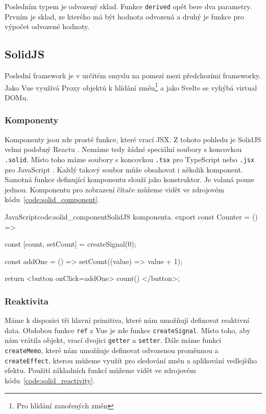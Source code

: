 \documentclass[
  master,
  program=ainf,
  tables=false,
  sourcecodes,
  glossaries,
  index
]{kidiplom}
\begin{document}
Posledním typem je odvozený sklad. Funkce {\tt derived} opět bere dva parametry. Prvním je sklad, ze kterého
má být hodnota odvozená a druhý je funkce pro výpočet odvozené hodnoty.

\subsection{SolidJS}

Poslední framework je v určitém smyslu na pomezí mezi předchozími frameworky. Jako Vue \cite{vue} využívá Proxy objektů \cite{proxy}
k hlídání změn\footnote{Pro hlídání zanořených změn} a jako Svelte \cite{svelte} se vyhýbá virtual DOMu.

\subsubsection{Komponenty}

Komponenty jsou zde prosté funkce, které vrací JSX. Z tohoto pohledu je SolidJS \cite{solidjs} velmi podobný Reactu \cite{react}.
Nemáme tedy žádné speciální soubory s koncovkou {\tt .solid}. Místo toho máme soubory s koncovkou {\tt .tsx} pro
TypeScript \cite{ts} nebo {\tt .jsx} pro JavaScript \cite{js}. Každý takový soubor může obsahovat i několik komponent. Samotná
funkce definující komponentu slouží jako konstruktor. Je volaná pouze jednou. Komponentu pro zobrazení
čítače můžeme vidět ve zdrojovém kódu~\ref{code:solid_component}.

  \begin{kicode}{JavaScript}{code:solid_component}{SolidJS komponenta.}
    export const Counter = () => {
      const [count, setCount] = createSignal(0);

      const addOne = () => setCount((value) => value + 1);

      return <button onClick={addOne}> {count()} </button>;
    }
  \end{kicode}

\subsubsection{Reaktivita}

Máme k dispozici tři hlavní primitiva, které nám umožňují definovat reaktivní data. Obdobou funkce {\tt ref}
z Vue \cite{vue} je zde funkce {\tt createSignal}. Místo toho, aby nám vrátila objekt, vrací dvojici {\tt getter} a {\tt setter}.
Dále máme funkci {\tt createMemo}, které nám umožňuje definovat odvozenou proměnnou a {\tt createEffect}, kterou 
můžeme využít pro sledování změn a aplikování vedlejšího efektu. Použití základních funkcí můžeme vidět ve 
zdrojovém kódu~\ref{code:solid_reactivity}.
\end{document}
